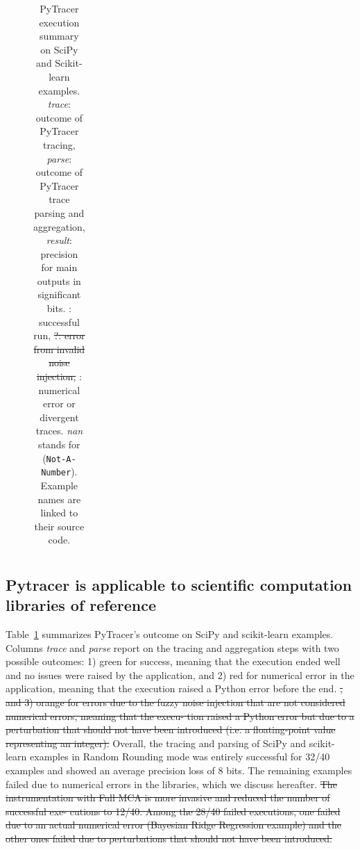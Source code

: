 \documentclass[10pt,journal,compsoc]{IEEEtran}
\newcommand{\cross}[0]{\cellcolor{red!65}\ding{53}}
\newcommand{\valid}[0]{\cellcolor{green!75!black}\ding{51}}
\newcommand{\warn}[0]{\cellcolor{orange!75}?}
\newcommand{\pytracer}[0]{PyTracer\xspace}
\DeclareRobustCommand{\remove}[1]{\textcolor{lightred}{\sout{#1}}}
\begin{document}
\begin{table}[]
\begin{subfigure}[t]{\linewidth}
\begin{tabular}{|lll|c|c|c|}
            \hline
        \end{tabular}
    \end{subfigure}
    \caption{\pytracer execution summary on SciPy and Scikit-learn examples.
        \emph{trace}: outcome of \pytracer tracing, \emph{parse}: outcome of
        \pytracer trace parsing and aggregation, \emph{result}: precision for
        main outputs in significant bits. \valid: successful run, \remove{\warn: error
            from invalid noise injection,} \cross: numerical error or divergent
        traces. \textit{nan} stands for (\texttt{Not-A-Number}). Example names
        are linked to their source code.}
    \label{tab:pytracer_results_summary}
\end{table}


\subsection{Pytracer is applicable to scientific computation libraries of reference}

Table~\ref{tab:pytracer_results_summary} summarizes \pytracer's outcome on SciPy
and scikit-learn examples. Columns \textit{trace} and \textit{parse} report on
the tracing and aggregation steps with two possible outcomes: 1) green for
success, meaning that the execution ended well and no issues were raised by the
application, and 2) red for numerical error in the application, meaning that the
execution raised a Python error before the end. \remove{, and 3)
    orange for errors due to the fuzzy noise injection that are
    not considered numerical errors, meaning that the execu-
    tion raised a Python error but due to a perturbation that
    should not have been introduced (i.e. a floating-point value
    representing an integer).}
Overall, the tracing and parsing of SciPy and scikit-learn examples in Random
Rounding mode was entirely successful for 32/40 examples and showed an average
precision loss of 8 bits. The remaining examples failed due to numerical errors
in the libraries, which we discuss hereafter. 
\remove{The instrumentation with Full MCA is
    more invasive and reduced the number of successful exe-
    cutions to 12/40. Among the 28/40 failed executions, one
    failed due to an actual numerical error (Bayesian Ridge
    Regression example) and the other ones failed due to
    perturbations that should not have been introduced.}
\end{document}
